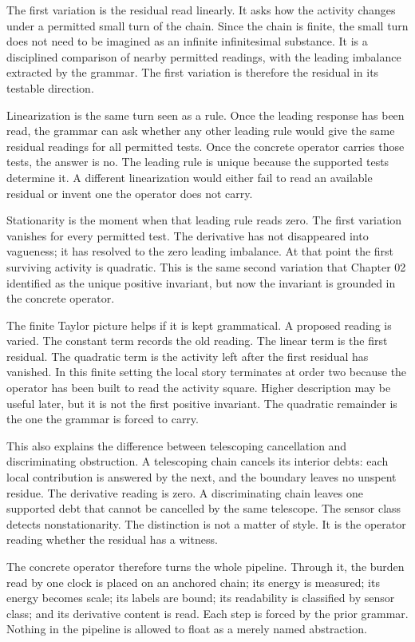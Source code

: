 The first variation is the residual read linearly. It asks how the activity
changes under a permitted small turn of the chain. Since the chain is
finite, the small turn does not need to be imagined as an infinite
infinitesimal substance. It is a disciplined comparison of nearby permitted
readings, with the leading imbalance extracted by the grammar. The first
variation is therefore the residual in its testable direction.

Linearization is the same turn seen as a rule. Once the leading response has
been read, the grammar can ask whether any other leading rule would give the
same residual readings for all permitted tests. Once the concrete operator
carries those tests, the answer is no. The leading rule is unique because
the supported tests determine it. A different linearization would either
fail to read an available residual or invent one the operator does not
carry.

Stationarity is the moment when that leading rule reads zero. The first
variation vanishes for every permitted test. The derivative has not
disappeared into vagueness; it has resolved to the zero leading imbalance.
At that point the first surviving activity is quadratic. This is the same
second variation that Chapter 02 identified as the unique positive
invariant, but now the invariant is grounded in the concrete operator.

The finite Taylor picture helps if it is kept grammatical. A proposed
reading is varied. The constant term records the old reading. The linear
term is the first residual. The quadratic term is the activity left after
the first residual has vanished. In this finite setting the local story
terminates at order two because the operator has been built to read the
activity square. Higher description may be useful later, but it is not the
first positive invariant. The quadratic remainder is the one the grammar is
forced to carry.

This also explains the difference between telescoping cancellation and
discriminating obstruction. A telescoping chain cancels its interior debts:
each local contribution is answered by the next, and the boundary leaves no
unspent residue. The derivative reading is zero. A discriminating chain
leaves one supported debt that cannot be cancelled by the same telescope.
The sensor class detects nonstationarity. The distinction is not a matter of
style. It is the operator reading whether the residual has a witness.

The concrete operator therefore turns the whole pipeline. Through it, the
burden read by one clock is placed on an anchored chain; its energy is
measured; its energy becomes scale; its labels are bound; its readability is
classified by sensor class; and its derivative content is read. Each step is
forced by the prior grammar. Nothing in the pipeline is allowed to float as
a merely named abstraction.

